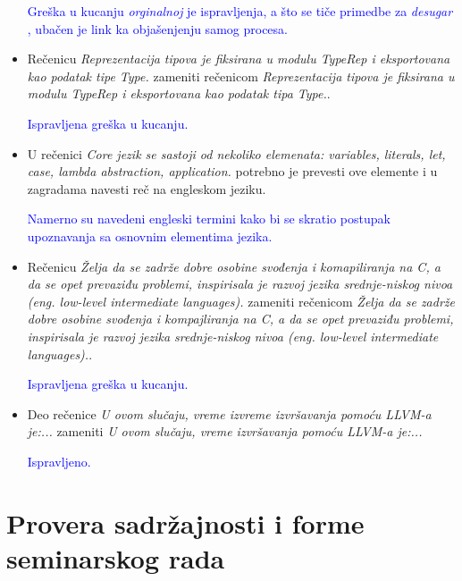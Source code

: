 \documentclass[a4paper]{report}
\newcommand{\odgovor}[1]{\textcolor{blue}{#1}}
\begin{document}
\begin{itemize}
		\odgovor{Greška u kucanju \textit{orginalnoj} je ispravljenja, a što se tiče primedbe za \textit{desugar} , ubačen je link ka objašenjenju samog procesa.}
		
		\item Rečenicu \textit{Reprezentacija tipova je fiksirana u modulu TypeRep i eksportovana kao podatak tipe Type.} zameniti rečenicom \textit{Reprezentacija tipova je fiksirana u modulu TypeRep i eksportovana kao podatak tipa Type.}.
		
		\odgovor{Ispravljena greška u kucanju.}
		
		\item U rečenici \textit{Core jezik se sastoji od nekoliko elemenata: variables, literals, let, case, lambda abstraction, application.} potrebno je prevesti ove elemente i u zagradama navesti reč na engleskom jeziku.
		
		\odgovor{Namerno su navedeni engleski termini kako bi se skratio postupak upoznavanja sa osnovnim elementima jezika.}
		
		\item Rečenicu \textit{Želja da se zadrže dobre osobine svođenja i komapiliranja na C, a da se opet prevaziđu problemi, inspirisala je razvoj jezika srednje-niskog nivoa (eng. low-level intermediate languages).} zameniti rečenicom \textit{Želja da se zadrže dobre osobine svođenja i kompajliranja na C, a da se opet prevaziđu problemi, inspirisala je razvoj jezika srednje-niskog nivoa (eng. low-level intermediate languages).}.
		
		\odgovor{Ispravljena greška u kucanju.}
		
		\item Deo rečenice \textit{U ovom slučaju, vreme izvreme izvršavanja pomoću LLVM-a je:...} zameniti \textit{U ovom slučaju, vreme izvršavanja pomoću LLVM-a je:...}
		
		\odgovor{Ispravljeno.}
		
	\end{itemize}
	
	
	\section{Provera sadržajnosti i forme seminarskog rada}
	
\end{document}
